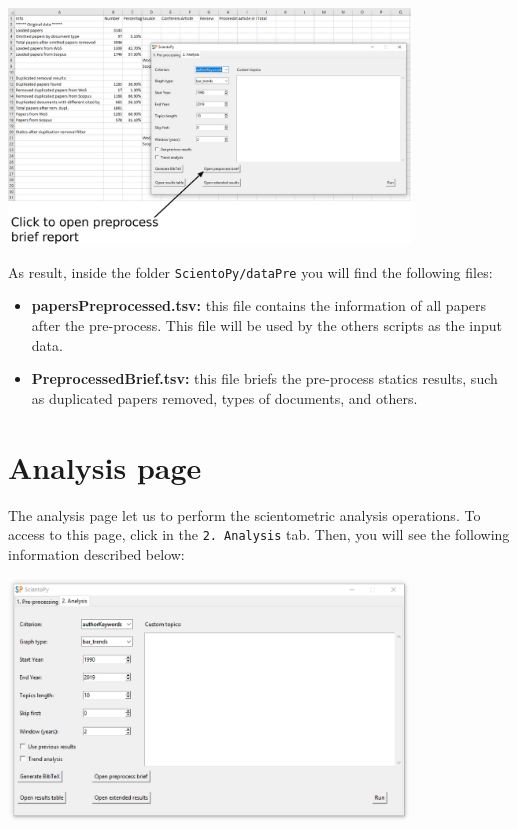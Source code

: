 \documentclass[10pt,letterpaper]{article}
\begin{document}
\begin{center}
	\includegraphics[width=0.8\textwidth]{./figures/win_preprocess3.eps}
\end{center}


As result, inside the folder \verb|ScientoPy/dataPre| you will find the following files: 
\begin{itemize}
\item \textbf{papersPreprocessed.tsv:} this file contains the information of all papers after the pre-process. This file will be used by the others scripts as the input data. 
\item \textbf{PreprocessedBrief.tsv:} this file briefs the pre-process statics results, such as duplicated papers removed, types of documents, and others. 
\end{itemize}


\section{Analysis page}

The analysis page let us to perform the scientometric analysis operations. To access to this page, click in the \verb|2. Analysis| tab. Then, you will see the following information described below:

\begin{center}
	\includegraphics[width=0.8\textwidth]{./figures/win_analysis1.eps}
\end{center}
\end{document}
